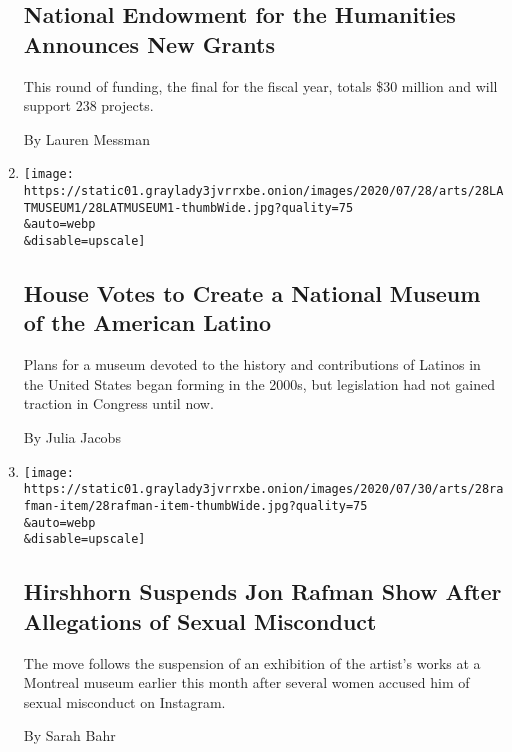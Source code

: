 \begin{enumerate}
  \hypertarget{national-endowment-for-the-humanities-announces-new-grants}{%
  \subsection{National Endowment for the Humanities Announces New
  Grants}\label{national-endowment-for-the-humanities-announces-new-grants}}

  This round of funding, the final for the fiscal year, totals \$30
  million and will support 238 projects.

  By Lauren Messman
\item
  \href{/2020/07/28/arts/design/national-museum-of-the-american-latino.html}{}

  \texttt{[image: https://static01.graylady3jvrrxbe.onion/images/2020/07/28/arts/28LATMUSEUM1/28LATMUSEUM1-thumbWide.jpg?quality=75\\\&auto=webp\\\&disable=upscale]}

  \hypertarget{house-votes-to-create-a-national-museum-of-the-american-latino}{%
  \subsection{House Votes to Create a National Museum of the American
  Latino}\label{house-votes-to-create-a-national-museum-of-the-american-latino}}

  Plans for a museum devoted to the history and contributions of Latinos
  in the United States began forming in the 2000s, but legislation had
  not gained traction in Congress until now.

  By Julia Jacobs
\item
  \href{/2020/07/28/arts/design/hirshhorn-museum-jon-rafman.html}{}

  \texttt{[image: https://static01.graylady3jvrrxbe.onion/images/2020/07/30/arts/28rafman-item/28rafman-item-thumbWide.jpg?quality=75\\\&auto=webp\\\&disable=upscale]}

  \hypertarget{hirshhorn-suspends-jon-rafman-show-after-allegations-of-sexual-misconduct}{%
  \subsection{Hirshhorn Suspends Jon Rafman Show After Allegations of
  Sexual
  Misconduct}\label{hirshhorn-suspends-jon-rafman-show-after-allegations-of-sexual-misconduct}}

  The move follows the suspension of an exhibition of the artist's works
  at a Montreal museum earlier this month after several women accused
  him of sexual misconduct on Instagram.

  By Sarah Bahr
\end{enumerate}

